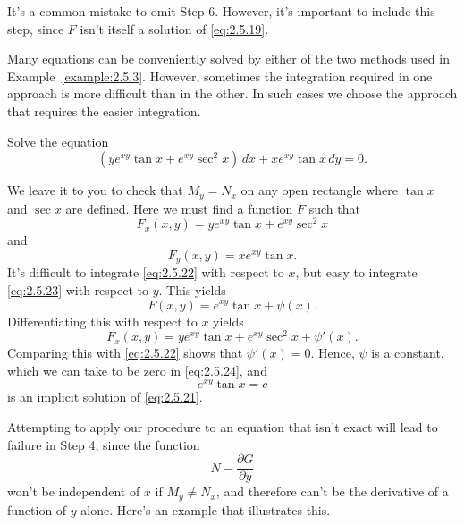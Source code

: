 \documentclass{ximera}
\begin{document}
 
 
It's a common mistake to omit Step 6. However, it's important to
include this step, since $F$ isn't  itself a solution of
\eqref{eq:2.5.19}.
 
Many equations can be conveniently solved by either of the two methods
used in Example~\ref{example:2.5.3}. However, sometimes the integration
required in one approach is  more difficult than in the
other. In such cases we choose the approach that requires the easier integration.
 
\begin{example}\label{example:2.5.4}
 Solve the equation
\begin{equation}  \label{eq:2.5.21}
(ye^{xy} \tan x+e^{xy} \sec^2x)\,dx+xe^{xy} \tan x\,dy=0.
\end{equation}
 
 
\begin{explanation} We leave it to you to check that
$M_y=N_x$ on any open rectangle  where $\tan x$ and $\sec x$ are
defined. Here we must find a function $F$ such that
\begin{equation} \label{eq:2.5.22}
F_x(x,y)=ye^{xy} \tan x+e^{xy} \sec^2 x
\end{equation}
 and
\begin{equation}  \label{eq:2.5.23}
F_y(x,y)=xe^{xy} \tan x.
\end{equation}
 It's difficult to integrate \eqref{eq:2.5.22} with respect to $x$, but
easy to integrate \eqref{eq:2.5.23} with respect to $y$.  This yields
\begin{equation} \label{eq:2.5.24}
F(x,y)=e^{xy} \tan x+\psi (x).
\end{equation}
Differentiating this with respect to $x$ yields
$$
F_x(x,y)=ye^{xy}\tan x+e^{xy}\sec^2x+\psi'(x).
$$
 Comparing this with \eqref{eq:2.5.22} shows that  $\psi'(x)=0$.
Hence, $\psi$ is  a constant, which we can take to be zero in
\eqref{eq:2.5.24}, and
$$
e^{xy} \tan x=c
$$
is an implicit solution of \eqref{eq:2.5.21}.
\end{explanation}
\end{example}
 
Attempting to apply our procedure to an equation that isn't  exact
will lead to failure in  Step 4, since the function
$$
 N-\frac{\partial G}{\partial y}
$$
won't be independent of $x$ if $M_y\neq N_x$,
and therefore
can't be the derivative of a function of $y$ alone. Here's an example that
illustrates this.
 
\end{document}
